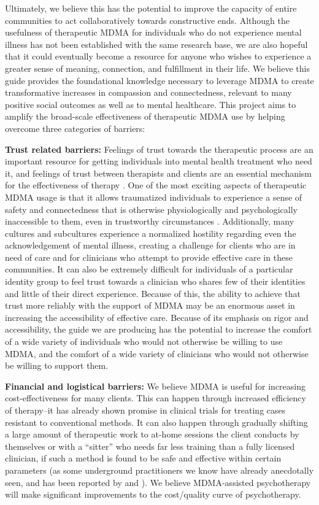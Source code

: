 \documentclass[12pt,letterpaper]{article}
\begin{document}
Ultimately, we believe this has the potential to improve the capacity of entire communities to act collaboratively towards constructive ends. Although the usefulness of therapeutic MDMA for individuals who do not experience mental illness has not been established with the same research base, we are also hopeful that it could eventually become a resource for anyone who wishes to experience a greater sense of meaning, connection, and fulfillment in their life. We believe this guide provides the foundational knowledge necessary to leverage MDMA to create transformative increases in compassion and connectedness, relevant to many positive social outcomes as well as to mental healthcare. This project aims to amplify the broad-scale effectiveness of therapeutic MDMA use by helping overcome three categories of barriers:

\textbf{Trust related barriers:} Feelings of trust towards the therapeutic process are an important resource for getting individuals into mental health treatment who need it, and feelings of trust between therapists and clients are an essential mechanism for the effectiveness of therapy \cite{wampoldCommonFactors}. One of the most exciting aspects of therapeutic MDMA usage is that it allows traumatized individuals to experience a sense of safety and connectedness that is otherwise physiologically and psychologically inaccessible to them, even in trustworthy circumstances \cite{fedduciaMDMAMemoryReconsolidation}. Additionally, many cultures and subcultures experience a normalized hostility regarding even the acknowledgement of mental illness, creating a challenge for clients who are in need of care and for clinicians who attempt to provide effective care in these communities. It can also be extremely difficult for individuals of a particular identity group to feel trust towards a clinician who shares few of their identities and little of their direct experience. Because of this, the ability to achieve that trust more reliably with the support of MDMA may be an enormous asset in increasing the accessibility of effective care. Because of its emphasis on rigor and accessibility, the guide we are producing has the potential to increase the comfort of a wide variety of individuals who would not otherwise be willing to use MDMA, and the comfort of a wide variety of clinicians who would not otherwise be willing to support them.

\textbf{Financial and logistical barriers:} We believe MDMA is useful for increasing cost-effectiveness for many clients. This can happen through increased efficiency of therapy–it has already shown promise in clinical trials for treating cases resistant to conventional methods. It can also happen through gradually shifting a large amount of therapeutic work to at-home sessions the client conducts by themselves or with a “sitter” who needs far less training than a fully licensed clinician, if such a method is found to be safe and effective within certain parameters (as some underground practitioners we know have already anecdotally seen, and has been reported by \textcite{colbertEvenings} and \textcite{hillsSolo}). We believe MDMA-assisted psychotherapy will make significant improvements to the cost/quality curve of psychotherapy.
\end{document}
